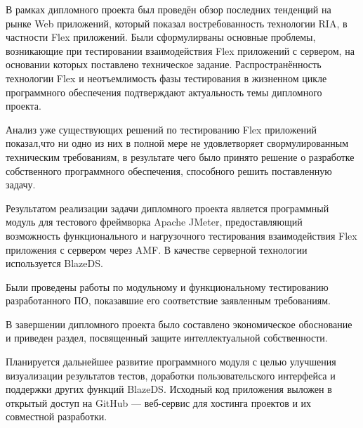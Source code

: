 \Conclusion

В рамках дипломного проекта был проведён обзор последних тенденций на рынке Web приложений, который
показал востребованность технологии RIA, в частности Flex приложений. Были сформулирваны основные проблемы,
возникающие при тестировании взаимодействия Flex приложений с сервером, на основании которых
поставлено техническое задание. Распространённость технологии
Flex и неотъемлимость фазы тестирования в жизненном цикле программного обеспечения подтверждают
актуальность темы дипломного проекта.

Анализ уже существующих решений по тестированию Flex приложений показал,что ни одно из них в полной мере не
удовлетворяет свормулированным техническим требованиям, в результате чего было принято решение о разработке
собственного программного обеспечения, способного решить поставленную задачу.

Результатом реализации задачи дипломного проекта является программный модуль для тестового фреймворка
Apache JMeter, предоставляющий возможность функционального и нагрузочного тестирования взаимодействия Flex
приложения с сервером через AMF. В качестве серверной технологии используется BlazeDS.

Были проведены работы по модульному и функциональному тестированию разработанного ПО, показавшие его соответствие
заявленным требованиям.

В завершении дипломного проекта было составлено экономическое обоснование и приведен раздел,
посвященный защите интеллектуальной собственности.

Планируется дальнейшее развитие программного модуля с целью улучшения визуализации результатов тестов,
доработки пользовательского интерфейса и поддержки других функций BlazeDS. Исходный код приложения выложен в открытый
доступ на GitHub --- веб-сервис для хостинга проектов и их совместной разработки.

